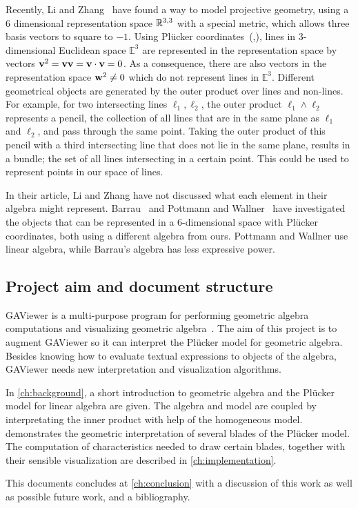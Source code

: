 Recently, Li and Zhang~\cite{Hongbo} have found a way to model projective geometry, using a 6 dimensional representation space $\mathbb{R}^{3,3}$ with a special metric, which allows three basis vectors to square to $-1$.  Using Pl\"ucker coordinates~(\cite{Hongbo},\cite[Chapter 2]{Pottmann}), lines in 3-dimensional Euclidean space $\mathbb{E}^3$ are represented in the representation space by vectors $\mathbf{v}^2 = \mathbf{v} \mathbf{v} = \mathbf{v} \cdot \mathbf{v} = 0$.  As a consequence, there are also vectors in the representation space $\mathbf{w}^2 \not= 0$ which do not represent lines in $\mathbb{E}^3$.  Different geometrical objects are generated by the outer product over lines and non-lines.  For example, for two intersecting lines $\ell_1, \ell_2$, the outer product $\ell_1 \wedge \ell_2$ represents a pencil, the collection of all lines that are in the same plane as $\ell_1$ and $\ell_2$, and pass through the same point.  Taking the outer product of this pencil with a third intersecting line that does not lie in the same plane, results in a bundle; the set of all lines intersecting in a certain point.  This could be used to represent points in our space of lines.

In their article, Li and Zhang have not discussed what each element in their algebra might represent.  Barrau~\cite{Barrau1,Barrau2} and Pottmann and Wallner~\cite[Chapter 2 and 3]{Pottmann} have investigated the objects that can be represented in a 6-dimensional space with Pl\"ucker coordinates, both using a different algebra from ours.  Pottmann and Wallner use linear algebra, while Barrau's algebra has less expressive power.  


\subsection{Project aim and document structure}

GAViewer is a multi-purpose program for performing geometric algebra computations and visualizing geometric algebra~\cite{GAViewer}.  The aim of this project is to augment GAViewer so it can interpret the Pl\"ucker model for geometric algebra.  Besides knowing how to evaluate textual expressions to objects of the algebra, GAViewer needs new interpretation and visualization algorithms.

In \autoref{ch:background}, a short introduction to geometric algebra and the Pl\"ucker model for linear algebra are given.  The algebra and model are coupled by interpretating the inner product with help of the homogeneous model.   demonstrates the geometric interpretation of several blades of the Pl\"ucker model.  The computation of characteristics needed to draw certain blades, together with their sensible visualization are described in \autoref{ch:implementation}.

This documents concludes at \autoref{ch:conclusion} with a discussion of this work as well as possible future work, and a bibliography.
